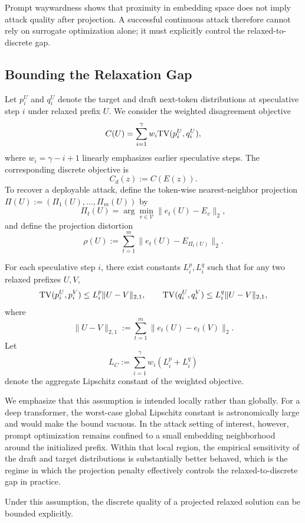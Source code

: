 Prompt waywardness shows that proximity in embedding space does not imply
attack quality after projection. A successful continuous attack therefore
cannot rely on surrogate optimization alone; it must explicitly control the
relaxed-to-discrete gap.

\subsection{Bounding the Relaxation Gap}

Let $p_i^U$ and $q_i^U$ denote the target and draft next-token distributions at
speculative step $i$ under relaxed prefix $U$. We consider the weighted
disagreement objective
\[
C(U) = \sum_{i=1}^{\gamma} w_i \mathrm{TV}(p_i^U, q_i^U),
\]
where $w_i = \gamma - i + 1$ linearly emphasizes earlier speculative steps.
The corresponding discrete objective is
\[
C_d(z) := C(E(z)).
\]
To recover a deployable attack, define the token-wise nearest-neighbor
projection $\Pi(U) := (\Pi_1(U), \dots, \Pi_m(U))$ by
\[
\Pi_t(U) = \arg\min_{v \in \mathcal{V}} \|e_t(U) - E_v\|_2,
\]
and define the projection distortion
\[
\rho(U) := \sum_{t=1}^{m} \|e_t(U) - E_{\Pi_t(U)}\|_2.
\]

\begin{assumption}[TV-Lipschitzness]
\label{assump:tv-lipschitz}
For each speculative step $i$, there exist constants $L_i^p, L_i^q$ such that
for any two relaxed prefixes $U, V$,
\[
\mathrm{TV}(p_i^U, p_i^V) \le L_i^p \|U - V\|_{2,1},
\qquad
\mathrm{TV}(q_i^U, q_i^V) \le L_i^q \|U - V\|_{2,1},
\]
where
\[
\|U - V\|_{2,1} := \sum_{t=1}^{m} \|e_t(U) - e_t(V)\|_2.
\]
Let
\[
L_C := \sum_{i=1}^{\gamma} w_i (L_i^p + L_i^q)
\]
denote the aggregate Lipschitz constant of the weighted objective.
\end{assumption}

We emphasize that this assumption is intended locally rather than globally.
For a deep transformer, the worst-case global Lipschitz constant is
astronomically large and would make the bound vacuous. In the attack setting of
interest, however, prompt optimization remains confined to a small embedding
neighborhood around the initialized prefix. Within that local region, the
empirical sensitivity of the draft and target distributions is substantially
better behaved, which is the regime in which the projection penalty
effectively controls the relaxed-to-discrete gap in practice.

Under this assumption, the discrete quality of a projected relaxed solution can
be bounded explicitly.

